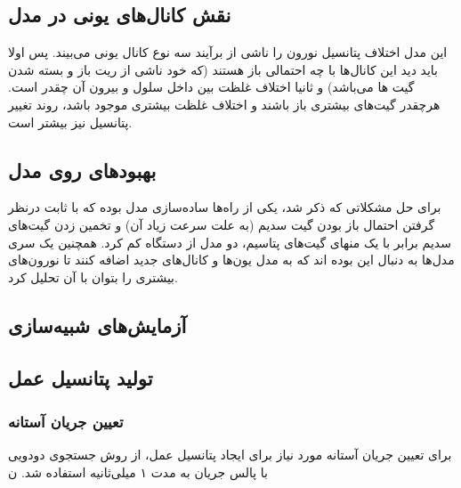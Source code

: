 \subsection*{نقش کانال‌های یونی در مدل}
این مدل اختلاف پتانسیل نورون را ناشی از برآیند سه نوع کانال یونی می‌بیند. پس اولا باید دید این کانال‌ها با چه احتمالی باز هستند  (که خود ناشی از ریت باز و بسته شدن گیت ها می‌باشد) و ثانیا اختلاف غلظت بین داخل سلول و بیرون آن چقدر است. هرچقدر گیت‌های بیشتری باز باشند و اختلاف غلظت بیشتری موجود باشد، روند تغییر پتانسیل نیز بیشتر است. 
\subsection*{بهبودهای روی مدل }
برای حل مشکلاتی که ذکر شد، یکی از راه‌ها ساده‌سازی مدل بوده که با ثابت درنظر گرفتن احتمال باز بودن گیت سدیم (به علت سرعت زیاد آن) و تخمین زدن گیت‌های 
سدیم برابر با یک منهای گیت‌های پتاسیم، دو مدل از دستگاه کم کرد. همچنین یک سری مدل‌ها به دنبال این بوده اند که به مدل 
یون‌ها و کانال‌های جدید اضافه کنند تا نورون‌های بیشتری را بتوان با آن تحلیل کرد.
\subsection{آزمایش‌های شبیه‌سازی}
































	

	
	\subsection{تولید پتانسیل عمل}
	
	\subsubsection{تعیین جریان آستانه}
	برای تعیین جریان آستانه مورد نیاز برای ایجاد پتانسیل عمل، از روش جستجوی دودویی با پالس جریان به مدت ۱ میلی‌ثانیه استفاده شد. ن
	
